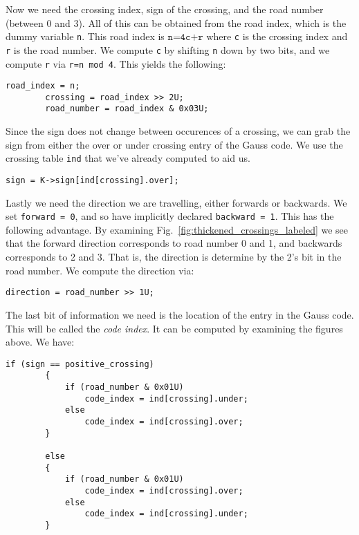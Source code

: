         Now we need the crossing index, sign of the crossing, and the road
        number (between 0 and 3). All of this can be obtained from the road
        index, which is the dummy variable \texttt{n}. This road index is
        $\texttt{n=4c+r}$ where \texttt{c} is the crossing index and
        \texttt{r} is the road number. We compute \texttt{c} by shifting
        \texttt{n} down by two bits, and we compute \texttt{r} via
        \texttt{r=n mod 4}. This yields the following:
\begin{lstlisting}[style=CStyle, firstnumber = 40]
        road_index = n;
        crossing = road_index >> 2U;
        road_number = road_index & 0x03U;
\end{lstlisting}
        Since the sign does not change between occurences of a crossing, we can
        grab the sign from either the over or under crossing entry of the Gauss
        code. We use the crossing table \texttt{ind} that we've already computed
        to aid us.
\begin{lstlisting}[style=CStyle, firstnumber = 44]
        sign = K->sign[ind[crossing].over];
\end{lstlisting}
        Lastly we need the direction we are travelling, either forwards or
        backwards. We set \texttt{forward = 0}, and so have implicitly
        declared \texttt{backward = 1}. This has the following advantage. By
        examining Fig.~\ref{fig:thickened_crossings_labeled} we see that the
        forward direction corresponds to road number 0 and 1, and backwards
        corresponds to 2 and 3. That is, the direction is determine by the
        2's bit in the road number. We compute the direction via:
\begin{lstlisting}[style=CStyle, firstnumber = 46]
        direction = road_number >> 1U;
\end{lstlisting}
        The last bit of information we need is the location of the entry in the
        Gauss code. This will be called the \textit{code index}. It can be
        computed by examining the figures above. We have:
\begin{lstlisting}[style=CStyle, firstnumber = 48]
        if (sign == positive_crossing)
        {
            if (road_number & 0x01U)
                code_index = ind[crossing].under;
            else
                code_index = ind[crossing].over;
        }

        else
        {
            if (road_number & 0x01U)
                code_index = ind[crossing].over;
            else
                code_index = ind[crossing].under;
        }
\end{lstlisting}
